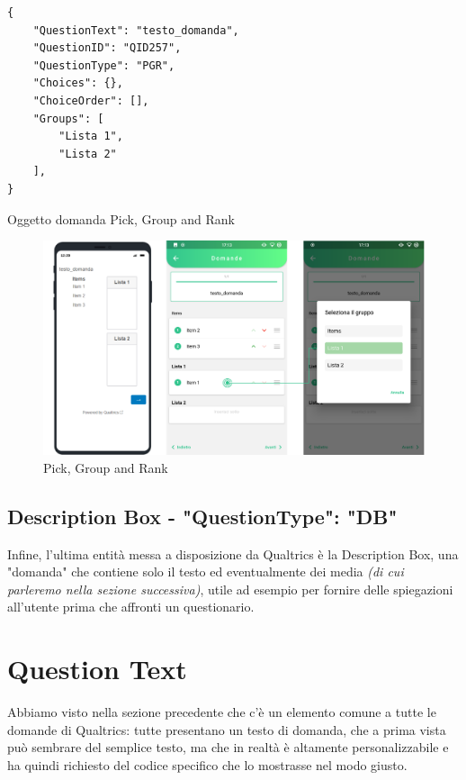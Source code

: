 \newpage
\begin{json}
\begin{verbatim}
{
    "QuestionText": "testo_domanda",
    "QuestionID": "QID257",
    "QuestionType": "PGR",
    "Choices": {},
    "ChoiceOrder": [],
    "Groups": [
        "Lista 1",
        "Lista 2"
    ],
}
\end{verbatim}
\caption{Oggetto domanda Pick, Group and Rank}
\label{json:PGR}
\end{json}

\begin{figure}[h!]
\centering
\includegraphics[width=\textwidth]{img/PGR}
\caption{Pick, Group and Rank}
\label{fig:PGR}
\end{figure}

\subsection{Description Box - "QuestionType": "DB"}
Infine, l'ultima entità messa a disposizione da Qualtrics è la Description Box, una "domanda" che contiene solo il testo ed eventualmente dei media \textit{(di cui parleremo nella sezione successiva)}, utile ad esempio per fornire delle spiegazioni all'utente prima che affronti un questionario.

\section{Question Text}
Abbiamo visto nella sezione precedente che c'è un elemento comune a tutte le domande di Qualtrics: tutte presentano un testo di domanda, che a prima vista può sembrare del semplice testo, ma che in realtà è altamente personalizzabile e ha quindi richiesto del codice specifico che lo mostrasse nel modo giusto.

